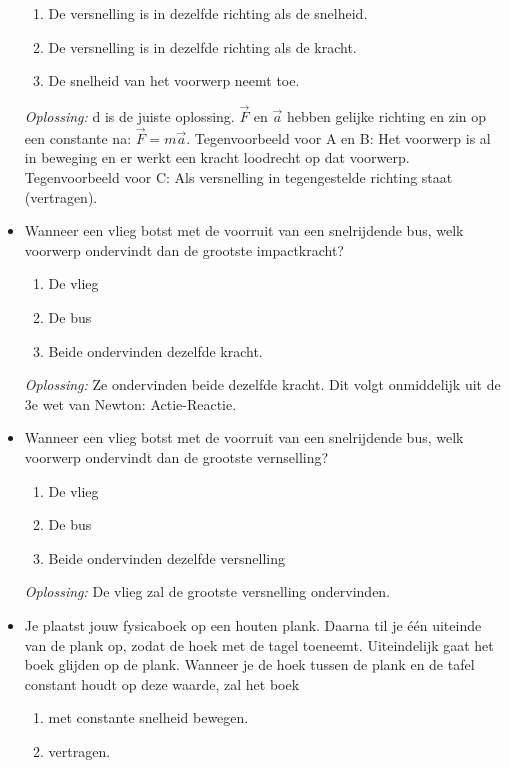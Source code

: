 \documentclass[12pt,a4paper]{article}
\begin{document}
\begin{itemize}
\begin{enumerate}[label=\alph*]
    	\item De versnelling is in dezelfde richting als de snelheid.
    	\item De versnelling is in dezelfde richting als de kracht.
    	\item De snelheid van het voorwerp neemt toe.
    \end{enumerate}
    \textit{Oplossing:} d is de juiste oplossing. $\vec{F}$ en $\vec{a}$ hebben gelijke richting en zin op een constante na: \(\vec{F} = m\vec{a}\). Tegenvoorbeeld voor A en B: Het voorwerp is al in beweging en er werkt een kracht loodrecht op dat voorwerp. Tegenvoorbeeld voor C: Als versnelling in tegengestelde richting staat (vertragen).
    \newline
    \item Wanneer een vlieg botst met de voorruit van een snelrijdende bus, welk voorwerp ondervindt dan de grootste impactkracht?
    \begin{enumerate}[label=\alph*]
    	\item De vlieg
    	\item De bus
    	\item Beide ondervinden dezelfde kracht.
    \end{enumerate}
    \textit{Oplossing:} Ze ondervinden beide dezelfde kracht. Dit volgt onmiddelijk uit de 3e wet van Newton: Actie-Reactie. 
    \newline
    \item Wanneer een vlieg botst met de voorruit van een snelrijdende bus, welk voorwerp ondervindt dan de grootste vernselling?
    \begin{enumerate}[label=\alph*]
    	\item De vlieg
    	\item De bus
    	\item Beide ondervinden dezelfde versnelling
    \end{enumerate}
    \textit{Oplossing:} De vlieg zal de grootste versnelling ondervinden. 
    \newline
    \item Je plaatst jouw fysicaboek op een houten plank. Daarna til je één uiteinde van de plank op, zodat de hoek met de tagel toeneemt. Uiteindelijk gaat het boek glijden op de plank. Wanneer je de hoek tussen de plank en de tafel constant houdt op deze waarde, zal het boek
    \begin{enumerate}[label=\alph*]
    	\item met constante snelheid bewegen.
    	\item vertragen.

\end{enumerate}
\end{itemize}
\end{document}
